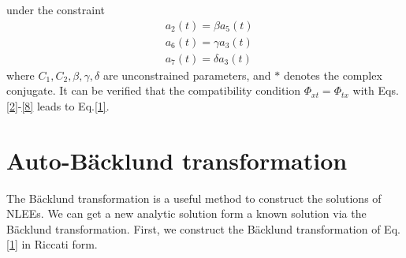 \documentclass[12pt]{article}
\begin{document}
under the constraint
\begin{align}
  & a_{2}(t) = \beta a_{5}(t) \label{18}\\
  & a_{6}(t) = \gamma a_{3}(t) \\
  & a_{7}(t) = \delta a_{3}(t)
\end{align}
where $C_{1}, C_{2}, \beta, \gamma, \delta$ are unconstrained parameters, and $*$ denotes the complex conjugate. It can be verified that the compatibility condition $\Phi_{xt} = \Phi_{tx}$ with Eqs.\eqref{2}-\eqref{8} leads to Eq.\eqref{1}.

\section{Auto-B\"acklund transformation}
The B\"acklund transformation is a useful method to construct the solutions of NLEEs. We can get a new analytic solution form a known solution via the B\"acklund transformation\cite{7,10}. First, we construct the B\"acklund transformation of Eq.\eqref{1} in Riccati form.
\end{document}
